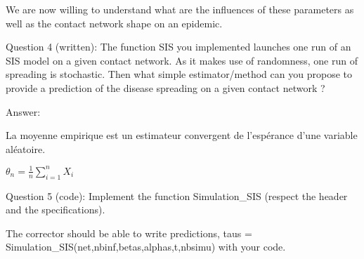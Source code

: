 \documentclass[11pt]{article}
\begin{document}
We are now willing to understand what are the influences of these
parameters as well as the contact network shape on an epidemic.

    Question 4 (written): The function SIS you implemented launches one run
of an SIS model on a given contact network. As it makes use of
randomness, one run of spreading is stochastic. Then what simple
estimator/method can you propose to provide a prediction of the disease
spreading on a given contact network ?

Answer:

    La moyenne empirique est un estimateur convergent de l'espérance d'une
variable aléatoire.

\(\theta_{n} = \frac{1}{n} \sum_{i=1}^n X_i\)

    Question 5 (code): Implement the function Simulation\_SIS (respect the
header and the specifications).

{The corrector should be able to write predictions, taus =
Simulation\_SIS(net,nbinf,betas,alphas,t,nbsimu) with your code.}
\end{document}
